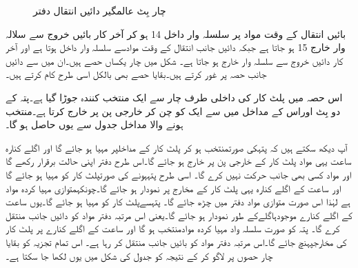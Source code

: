 \begin{figure}
\caption{چار بِٹ عالمگیر  دائیں انتقال  دفتر}
\label{شکل_دفتر_عالمگیر_انتقال_دفتر}
\end{figure}


بائیں انتقال  کے وقت   مواد پر سلسلہ وار داخل 14 ہو کر آخر کار بائیں خروج سے سلالہ وار خارج 15 ہو جاتا ہے جبکہ دائیں جانب انتقال  کے وقت موادسے سلسلہ وار داخل ہوتا ہے اور آخر کار  دائیں خروج سے سلسلہ وار خارج ہو جاتا ہے۔
	شکل میں چار یکساں حصے ہیں۔ان میں سے دائیں جانب حصہ پر غور کرتے ہیں۔بقایا حصے بھی بالکل اسی طرح کام کرتے ہیں۔ 


	اس حصہ میں پلٹ کار کی داخلی طرف چار سے ایک منتخب کنندہ جوڑا گیا ہے۔پتہ کے دو بِٹ اوراس کے مداخل میں سے ایک کو چن کر خارجی پن پر خارج کرتا ہے۔منتخب ہونے والا مداخل جدول سے یوں حاصل ہو گا۔
 
	آپ دیکھ سکتے ہیں کہ پتہکی صورتمنتخب ہو کر پلٹ کار کے مداخلپر مہیا ہو جائے گا اور اگلے کنارہ ساعت یہی مواد پلٹ کار کے خارجی پن پر خارج ہو جائے گا۔اس طرح دفتر اپنی حالت برقرار رکھے گا اور مواد کسی بھی جانب حرکت نہیں کرے گا۔
	اسی طرح پتہہونے کی صورتپلٹ کار کو مہیا ہو جائے گا اور ساعت کے اگلے کنارہ یہی پلٹ کار کے مخارج پر نمودار ہو جائے گا۔چونکہمتوازی مہیا کردہ مواد ہے لہٰذا اس صورت متوازی مواد دفتر میں چڑھ جائے گا۔
	پتہسےپلٹ کار کو مہیا ہو جائے گا۔یوں ساعت کے اگلے کنارے موجودہاگلےکے طور نمودار ہو جائے گا۔یعنی اس مرتبہ دفتر مواد کو دائیں جانب منتقل کرے گا۔
	پتہ کو صورت سلسلہ واد مہیا کردہ موادمنتخب ہو گا اور ساعت کے اگلے کنارے پر پلٹ کار کی مخارجپہنچ جائے گا۔اس مرتبہ دفتر مواد کو بائیں جانب منتقل کر رہا ہے۔
	اس تمام تجزیہ کو بقایا چار حصوں پر لاگو کر کے نتیجہ کو جدول کی شکل میں یوں لکھا جا سکتا ہے۔


